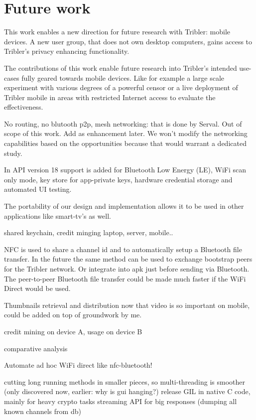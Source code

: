 \section{Future work}
\label{ch:future_work}

This work enables a new direction for future research with Tribler: mobile devices.
A new user group, that does not own desktop computers, gains access to Tribler's privacy enhancing functionality.

The contributions of this work enable future research into Tribler's intended use-cases fully geared towards mobile devices.
Like for example a large scale experiment with various degrees of a powerful censor or a live deployment of Tribler mobile in areas with restricted Internet access to evaluate the effectiveness.



No routing, no blutooth p2p, mesh networking: that is done by Serval. Out of scope of this work. Add as enhancement later.
We won't modify the networking capabilities based on the opportunities because that would warrant a dedicated study.


In API version 18 support is added for Bluetooth Low Energy (LE), WiFi scan only mode, key store for app-private keys, hardware credential storage and automated UI testing.


The portability of our design and implementation allows it to be used in other applications like smart-tv's as well.



shared keychain, credit minging laptop, server, mobile..


NFC is used to share a channel id and to automatically setup a Bluetooth file transfer.
In the future the same method can be used to exchange bootstrap peers for the Tribler network. Or integrate into apk just before sending via Bluetooth.
The peer-to-peer Bluetooth file transfer could be made much faster if the WiFi Direct would be used.


Thumbnails retrieval and distribution now that video is so important on mobile, could be added on top of groundwork by me.


credit mining on device A, usage on device B


comparative analysis

Automate ad hoc WiFi direct like nfc-bluetooth!

cutting long running methods in smaller pieces, so multi-threading is smoother (only discovered now, earlier: why is gui hanging?)
release GIL in native C code, mainly for heavy crypto tasks
streaming API for big responses (dumping all known channels from db)

